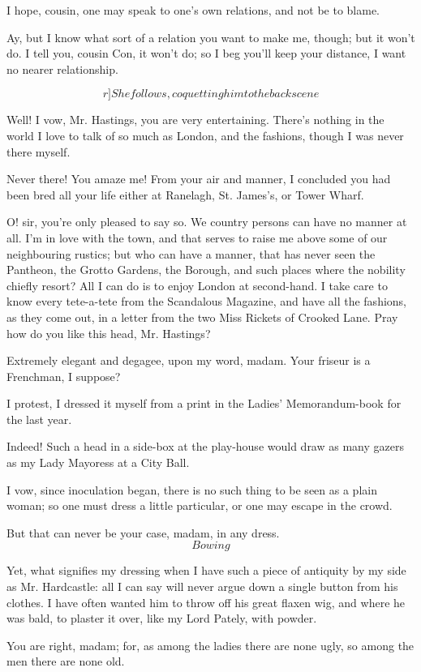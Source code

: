 \documentclass{book}
\begin{document}
\9  I hope, cousin, one may speak to one's own relations,
and not be to blame.

\5  Ay, but I know what sort of a relation you want to make me,
though; but it won't do.  I tell you, cousin Con, it won't do; so I beg
you'll keep your distance, I want no nearer relationship.

\[r]She follows, coquetting him to the back scene\]

\7  Well!  I vow, Mr. Hastings, you are very
entertaining.  There's nothing in the world I love to talk of so much
as London, and the fashions, though I was never there myself.

\4  Never there!  You amaze me!  From your air and manner, I
concluded you had been bred all your life either at Ranelagh, St. 
James's, or Tower Wharf.

\7  O! sir, you're only pleased to say so.  We country
persons can have no manner at all.  I'm in love with the town, and that
serves to raise me above some of our neighbouring rustics; but who can
have a manner, that has never seen the Pantheon, the Grotto Gardens,
the Borough, and such places where the nobility chiefly resort?  All I
can do is to enjoy London at second-hand.  I take care to know every
tete-a-tete from the Scandalous Magazine, and have all the fashions, as
they come out, in a letter from the two Miss Rickets of Crooked Lane. 
Pray how do you like this head, Mr. Hastings?

\4  Extremely elegant and degagee, upon my word, madam.  Your
friseur is a Frenchman, I suppose?

\7  I protest, I dressed it myself from a print in the
Ladies' Memorandum-book for the last year.

\4  Indeed!  Such a head in a side-box at the play-house would
draw as many gazers as my Lady Mayoress at a City Ball.

\7  I vow, since inoculation began, there is no such
thing to be seen as a plain woman; so one must dress a little
particular, or one may escape in the crowd.

\4  But that can never be your case, madam, in any dress. 
\[Bowing\]

\7  Yet, what signifies my dressing when I have such a
piece of antiquity by my side as Mr. Hardcastle: all I can say will
never argue down a single button from his clothes.  I have often wanted
him to throw off his great flaxen wig, and where he was bald, to
plaster it over, like my Lord Pately, with powder.

\4  You are right, madam; for, as among the ladies there are
none ugly, so among the men there are none old.
\end{document}
